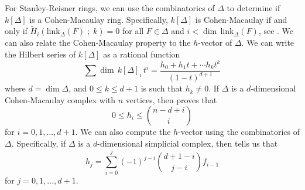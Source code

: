 \documentclass[12pt,leqno]{amsart}
\theoremstyle{definition}
\begin{document}

For Stanley-Reisner rings, we can use the combinatorics of $\Delta$ to determine if $k[\Delta]$ is a Cohen-Macaulay ring. Specifically, $k[\Delta]$ is Cohen-Macaulay if and only if $\widetilde H_i(\mathrm{link}_\Delta(F)\; ;\;k) = 0$ for all $F \in \Delta$ and $i < \dim \hspace{2pt} \mathrm{link}_\Delta(F)$, see \cite[Corollary 5.3.9]{BH}. We can also relate the Cohen-Macaulay property to the $h$-vector of $\Delta$. We can write the Hilbert series of $k[\Delta]$ as a rational function
%
\begin{displaymath}
  \sum \dim \hspace{2pt} k[\Delta]_i \hspace{2pt} t^i = \frac {h_0 + h_1t + \cdots h_k t^k}{(1-t)^{d+1}}
\end{displaymath}
%
where $d = \dim \Delta$, and $0 \leq k \leq d+1$ is such that $h_k \not = 0$. If $\Delta$ is a $d$-dimensional Cohen-Macaulay complex with $n$ vertices, then \cite[Lemma 5.1.10]{BH} proves that
%
\begin{displaymath}
  0 \leq h_i \leq \binom{n-d+i}{i}
\end{displaymath}
%
for $i = 0,1,...,d+1$. We can also compute the $h$-vector using the combinatorics of $\Delta$. Specifically, if $\Delta$ is a $d$-dimensional simplicial complex, then \cite[Lemma 5.1.8]{BH} tells us that
%
\begin{displaymath}
  h_j = \sum_{i=0}^j (-1)^{j-i} \binom{d+1-i}{j-i}f_{i-1}
\end{displaymath}
%
for $j = 0,1,...,d+1$.
%
\end{document}

